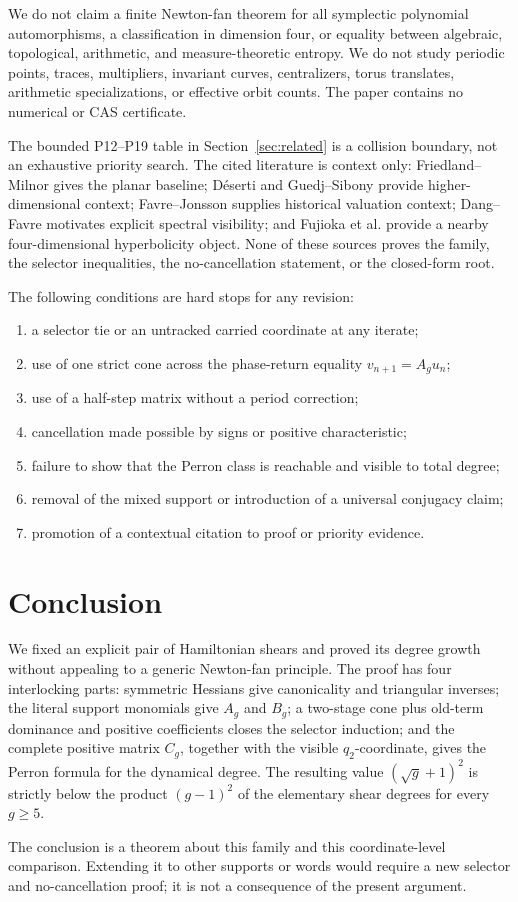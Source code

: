 \documentclass[11pt]{article}
\theoremstyle{remark}
\numberwithin{equation}{section}
\begin{document}
We do not claim a finite Newton-fan theorem for all symplectic polynomial
automorphisms, a classification in dimension four, or equality between
algebraic, topological, arithmetic, and measure-theoretic entropy.  We do not
study periodic points, traces, multipliers, invariant curves, centralizers,
torus translates, arithmetic specializations, or effective orbit counts.  The
paper contains no numerical or CAS certificate.

The bounded P12--P19 table in Section~\ref{sec:related} is a collision boundary,
not an exhaustive priority search.  The cited literature is context only:
Friedland--Milnor gives the planar baseline; Déserti and Guedj--Sibony provide
higher-dimensional context; Favre--Jonsson supplies historical valuation
context; Dang--Favre motivates explicit spectral visibility; and Fujioka et al.
provide a nearby four-dimensional hyperbolicity object.  None of these sources
proves the family, the selector inequalities, the no-cancellation statement,
or the closed-form root.

The following conditions are hard stops for any revision:
\begin{enumerate}
\item a selector tie or an untracked carried coordinate at any iterate;
\item use of one strict cone across the phase-return equality
  \(v_{n+1}=A_gu_n\);
\item use of a half-step matrix without a period correction;
\item cancellation made possible by signs or positive characteristic;
\item failure to show that the Perron class is reachable and visible to total
  degree;
\item removal of the mixed support or introduction of a universal conjugacy
  claim;
\item promotion of a contextual citation to proof or priority evidence.
\end{enumerate}

\section{Conclusion}\label{sec:conclusion}

We fixed an explicit pair of Hamiltonian shears and proved its degree growth
without appealing to a generic Newton-fan principle.  The proof has four
interlocking parts: symmetric Hessians give canonicality and triangular
inverses; the literal support monomials give \(A_g\) and \(B_g\); a
two-stage cone plus old-term dominance and positive coefficients closes the
selector induction; and the complete positive matrix \(C_g\), together with
the visible \(q_2\)-coordinate, gives the Perron formula for the dynamical
degree.  The resulting value \((\sqrt g+1)^2\) is strictly below the product
\((g-1)^2\) of the elementary shear degrees for every \(g\geq5\).

The conclusion is a theorem about this family and this coordinate-level
comparison.  Extending it to other supports or words would require a new
selector and no-cancellation proof; it is not a consequence of the present
argument.



\end{document}
